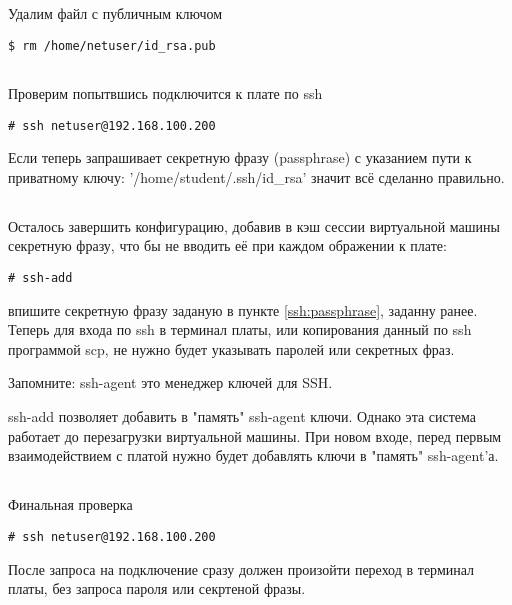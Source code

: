 \subsection{}Удалим файл с публичным ключом
\begin{lstlisting}[style=bash]
$ rm /home/netuser/id_rsa.pub
\end{lstlisting}

\subsection{}Проверим попытвшись подключится к плате по ssh
\begin{lstlisting}[style=bash]
# ssh netuser@192.168.100.200
\end{lstlisting}
Если теперь запрашивает секретную фразу (passphrase) с указанием пути к приватному ключу: '/home/student/.ssh/id\_rsa' значит всё сделанно правильно.

\subsection{}Осталось завершить конфигурацию, добавив в кэш сессии виртуальной машины секретную фразу, что бы не вводить её при каждом ображении к плате:
\begin{lstlisting}[style=bash]
# ssh-add
\end{lstlisting}
впишите секретную фразу заданую в пункте \ref{ssh:passphrase}, заданну ранее. Теперь для входа по ssh в терминал платы, или копирования данный по ssh программой scp, не нужно будет указывать паролей или секретных фраз.  

\begin{Notes}{Запомните:}
ssh-agent это менеджер ключей для SSH. 

ssh-add позволяет добавить в "память" ssh-agent ключи. Однако эта система работает до перезагрузки виртуальной машины. При новом входе, перед первым взаимодействием с платой нужно будет добавлять ключи в "память" ssh-agent'а.
\end{Notes}

\subsection{}Финальная проверка
\begin{lstlisting}[style=bash]
# ssh netuser@192.168.100.200
\end{lstlisting}
После запроса на подключение сразу должен произойти переход в терминал платы, без запроса пароля или секртеной фразы.

